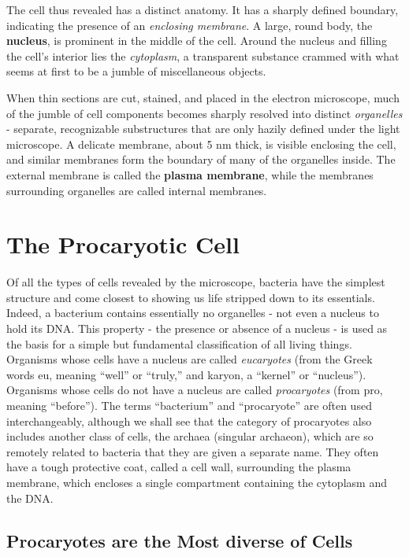 The cell thus revealed has a distinct anatomy. It has a sharply
defined boundary, indicating the presence of an \textit{enclosing membrane}.
A large, round body, the \textbf{nucleus}, is prominent in the middle of the cell.
Around the nucleus and filling the cell’s interior lies the \textit{cytoplasm}, a
transparent substance crammed with what seems at first to be a jumble
of miscellaneous objects.

When thin sections are cut, stained, and placed in the electron microscope,
much of the jumble of cell components becomes sharply resolved
into distinct \textit{organelles} - separate, recognizable substructures that are
only hazily defined under the light microscope. A delicate membrane,
about 5 nm thick, is visible enclosing the cell, and similar membranes
form the boundary of many of the organelles inside. The
external membrane is called the \textbf{plasma membrane}, while the membranes
surrounding organelles are called internal membranes.

\section{The Procaryotic Cell}

Of all the types of cells revealed by the microscope, bacteria have the
simplest structure and come closest to showing us life stripped down to
its essentials. Indeed, a bacterium contains essentially no organelles - not
even a nucleus to hold its DNA. This property - the presence or absence of
a nucleus - is used as the basis for a simple but fundamental classification
of all living things. Organisms whose cells have a nucleus are called
\textit{eucaryotes} (from the Greek words eu, meaning “well” or “truly,” and
karyon, a “kernel” or “nucleus”). Organisms whose cells do not have a
nucleus are called \textit{procaryotes} (from pro, meaning “before”). The terms
“bacterium” and “procaryote” are often used interchangeably, although
we shall see that the category of procaryotes also includes another class
of cells, the archaea (singular archaeon), which are so remotely related to
bacteria that they are given a separate name.
They often have a tough protective coat, called a cell wall, surrounding the plasma
membrane, which encloses a single compartment containing the cytoplasm and the DNA.

\subsection{Procaryotes are the Most diverse of Cells}


